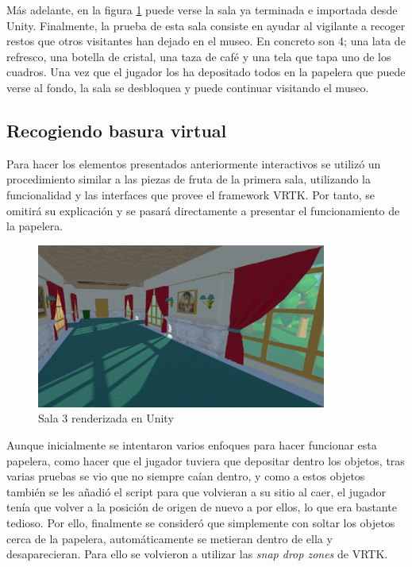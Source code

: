 Más adelante, en la figura \ref{fig:unity-sala-3} puede verse la sala ya terminada e importada desde Unity. Finalmente, la prueba de esta sala consiste en ayudar al vigilante a recoger restos que otros visitantes han dejado en el museo. En concreto son 4; una lata de refresco, una botella de cristal, una taza de café y una tela que tapa uno de los cuadros. Una vez que el jugador los ha depositado todos en la papelera que puede verse al fondo, la sala se desbloquea y puede continuar visitando el museo.

\subsection{Recogiendo basura virtual}

Para hacer los elementos presentados anteriormente interactivos se utilizó un procedimiento similar a las piezas de fruta de la primera sala, utilizando la funcionalidad y las interfaces que provee el framework \acs{VRTK}. Por tanto, se omitirá su explicación y se pasará directamente a presentar el funcionamiento de la papelera.

\begin{figure}[!h]
\begin{center}
\includegraphics[width=0.85\textwidth]{imagenes/7/salas-unity/unity-sala-3.png}
\caption{Sala 3 renderizada en Unity}
\label{fig:unity-sala-3}
\end{center}
\end{figure}

Aunque inicialmente se intentaron varios enfoques para hacer funcionar esta papelera, como hacer que el jugador tuviera que depositar dentro los objetos, tras varias pruebas se vio que no siempre caían dentro, y como a estos objetos también se les añadió el script para que volvieran a su sitio al caer, el jugador tenía que volver a la posición de origen de nuevo a por ellos, lo que era bastante tedioso. Por ello, finalmente se consideró que simplemente con soltar los objetos cerca de la papelera, automáticamente se metieran dentro de ella y desaparecieran. Para ello se volvieron a utilizar las \textit{snap drop zones} de \acs{VRTK}. 

